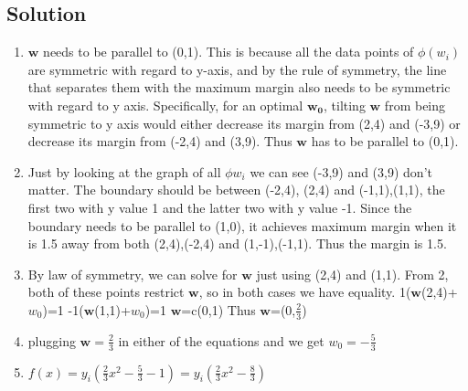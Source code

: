 \documentclass[submit]{harvardml}
\begin{document}
\subsection*{Solution}
\begin{enumerate}
\item $\mathbf{w}$ needs to be parallel to (0,1). This is because all the data points of $\phi(w_i)$ are symmetric with regard to y-axis, and by the rule of symmetry, the line that separates them with the maximum margin also needs to be symmetric with regard to y axis. Specifically, for an optimal $\mathbf{w_0}$, tilting $\mathbf{w}$ from being symmetric  to y axis would either decrease its margin from (2,4) and (-3,9) or decrease its margin from (-2,4) and (3,9). Thus $\mathbf{w}$ has to be parallel to (0,1).

\item Just by looking at the graph of all $\phi{w_i}$ we can see (-3,9) and (3,9) don't matter. The boundary should be between (-2,4), (2,4) and (-1,1),(1,1), the first two with y value 1 and the latter two with y value -1. Since the boundary needs to be parallel to (1,0), it achieves maximum margin when it is 1.5 away from both (2,4),(-2,4) and (1,-1),(-1,1). Thus the margin is 1.5.

\item By law of symmetry, we can solve for $\mathbf{w}$ just using (2,4) and (1,1). From 2, both of these points restrict $\mathbf{w}$, so in both cases we have  equality. 
1($\mathbf{w}$(2,4)+$w_0$)=1
-1($\mathbf{w}$(1,1)+$w_0$)=1
$\mathbf{w}$=c(0,1)
Thus $\mathbf{w}$=(0,$\frac{2}{3}$)

\item plugging $\mathbf{w}=\frac{2}{3}$ in either of the equations and we get $w_0=-\frac{5}{3}$ 

\item $f(x)=y_i(\frac{2}{3}x^2-\frac{5}{3}-1)=y_i(\frac{2}{3}x^2-\frac{8}{3})$


\end{enumerate}
\end{document}
